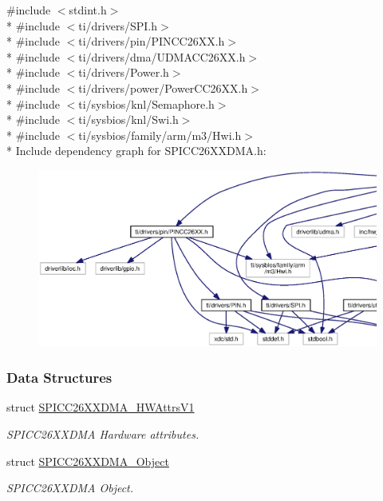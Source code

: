 {\ttfamily \#include $<$stdint.\+h$>$}\\*
{\ttfamily \#include $<$ti/drivers/\+S\+P\+I.\+h$>$}\\*
{\ttfamily \#include $<$ti/drivers/pin/\+P\+I\+N\+C\+C26\+X\+X.\+h$>$}\\*
{\ttfamily \#include $<$ti/drivers/dma/\+U\+D\+M\+A\+C\+C26\+X\+X.\+h$>$}\\*
{\ttfamily \#include $<$ti/drivers/\+Power.\+h$>$}\\*
{\ttfamily \#include $<$ti/drivers/power/\+Power\+C\+C26\+X\+X.\+h$>$}\\*
{\ttfamily \#include $<$ti/sysbios/knl/\+Semaphore.\+h$>$}\\*
{\ttfamily \#include $<$ti/sysbios/knl/\+Swi.\+h$>$}\\*
{\ttfamily \#include $<$ti/sysbios/family/arm/m3/\+Hwi.\+h$>$}\\*
Include dependency graph for S\+P\+I\+C\+C26\+X\+X\+D\+M\+A.\+h\+:
\nopagebreak
\begin{figure}[H]
\begin{center}
\leavevmode
\includegraphics[width=350pt]{_s_p_i_c_c26_x_x_d_m_a_8h__incl}
\end{center}
\end{figure}
\subsubsection*{Data Structures}
\begin{DoxyCompactItemize}
\item 
struct \hyperlink{struct_s_p_i_c_c26_x_x_d_m_a___h_w_attrs_v1}{S\+P\+I\+C\+C26\+X\+X\+D\+M\+A\+\_\+\+H\+W\+Attrs\+V1}
\begin{DoxyCompactList}\small\item\em S\+P\+I\+C\+C26\+X\+X\+D\+M\+A Hardware attributes. \end{DoxyCompactList}\item 
struct \hyperlink{struct_s_p_i_c_c26_x_x_d_m_a___object}{S\+P\+I\+C\+C26\+X\+X\+D\+M\+A\+\_\+\+Object}
\begin{DoxyCompactList}\small\item\em S\+P\+I\+C\+C26\+X\+X\+D\+M\+A Object. \end{DoxyCompactList}\end{DoxyCompactItemize}
